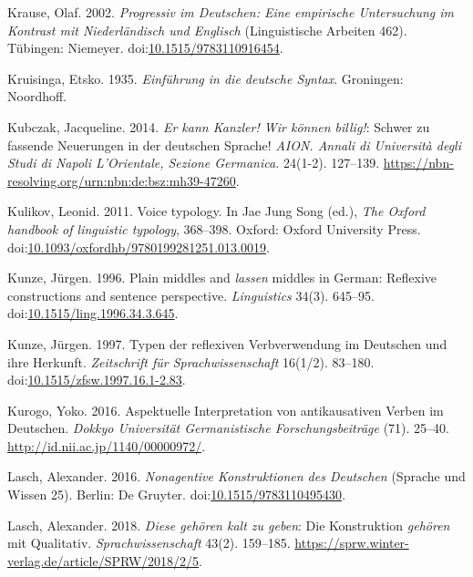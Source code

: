 \leavevmode{}%
Krause, Olaf. 2002. \emph{Progressiv im {Deutschen}: Eine empirische
{Untersuchung} im {Kontrast} mit {Niederländisch} und {Englisch}}
(Linguistische Arbeiten 462). Tübingen: Niemeyer.
doi:\href{https://doi.org/10.1515/9783110916454}{10.1515/9783110916454}.

\leavevmode{}%
Kruisinga, Etsko. 1935. \emph{Einführung in die deutsche {Syntax}}.
Groningen: Noordhoff.

\leavevmode{}%
Kubczak, Jacqueline. 2014. \emph{Er kann {Kanzler}! Wir können billig!}:
Schwer zu fassende {Neuerungen} in der deutschen {Sprache}! \emph{AION.
Annali di Università degli Studi di Napoli L'Orientale, Sezione
Germanica.} 24(1-2). 127--139.
\url{https://nbn-resolving.org/urn:nbn:de:bsz:mh39-47260}.

\leavevmode{}%
Kulikov, Leonid. 2011. Voice typology. In Jae Jung Song (ed.), \emph{The
{Oxford} handbook of linguistic typology}, 368--398. Oxford: Oxford
University Press.
doi:\href{https://doi.org/10.1093/oxfordhb/9780199281251.013.0019}{10.1093/oxfordhb/9780199281251.013.0019}.

\leavevmode{}%
Kunze, Jürgen. 1996. Plain middles and \emph{lassen} middles in
{German}: Reflexive constructions and sentence perspective.
\emph{Linguistics} 34(3). 645--95.
doi:\href{https://doi.org/10.1515/ling.1996.34.3.645}{10.1515/ling.1996.34.3.645}.

\leavevmode{}%
Kunze, Jürgen. 1997. Typen der reflexiven {Verbverwendung} im
{Deutschen} und ihre {Herkunft}. \emph{Zeitschrift für
Sprachwissenschaft} 16(1/2). 83--180.
doi:\href{https://doi.org/10.1515/zfsw.1997.16.1-2.83}{10.1515/zfsw.1997.16.1-2.83}.

\leavevmode{}%
Kurogo, Yoko. 2016. Aspektuelle {Interpretation} von antikausativen
{Verben} im {Deutschen}. \emph{Dokkyo Universität Germanistische
Forschungsbeiträge} (71). 25--40.
\url{http://id.nii.ac.jp/1140/00000972/}.

\leavevmode{}%
Lasch, Alexander. 2016. \emph{Nonagentive {Konstruktionen} des
{Deutschen}} (Sprache {und} Wissen 25). Berlin: De Gruyter.
doi:\href{https://doi.org/10.1515/9783110495430}{10.1515/9783110495430}.

\leavevmode{}%
Lasch, Alexander. 2018. \emph{Diese gehören kalt zu geben}: Die
{Konstruktion} \emph{gehören} mit {Qualitativ}.
\emph{Sprachwissenschaft} 43(2). 159--185.
\url{https://sprw.winter-verlag.de/article/SPRW/2018/2/5}.

